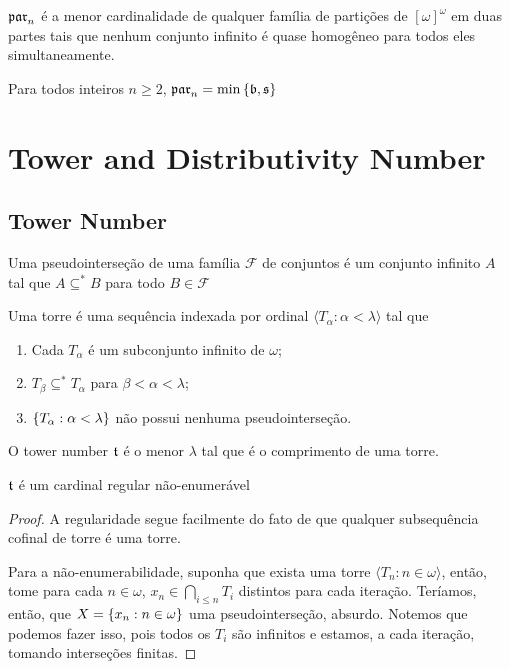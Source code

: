 \begin{definition}
    $\mathfrak{par}_n$ é a menor cardinalidade de qualquer família de partições de $[\omega]^\omega$ em duas partes tais que nenhum conjunto infinito é quase homogêneo para todos eles simultaneamente.
\end{definition}

\begin{theorem}
    Para todos inteiros $n \geq 2$, $\mathfrak{par}_n = \min\left\{ \mathfrak{b},\mathfrak{s} \right\}$
\end{theorem}

\section{Tower and Distributivity Number}
\subsection{Tower Number}
\begin{definition}
    Uma pseudointerseção de uma família $\mathcal F$ de conjuntos é um conjunto infinito $A$ tal que $A \subseteq^* B$ para todo $B \in \mathcal F$
\end{definition}

\begin{definition}
    Uma torre é uma sequência indexada por ordinal $\langle T_\alpha: \alpha < \lambda \rangle$ tal que
    \begin{enumerate}[label=\roman*)]
        \item Cada $T_\alpha$ é um subconjunto infinito de $\omega$;
        \item $T_\beta \subseteq^* T_\alpha$ para $\beta < \alpha < \lambda$;
        \item $\left\{ T_\alpha : \alpha < \lambda \right\}$ não possui nenhuma pseudointerseção.
    \end{enumerate}
\end{definition}

\begin{definition}
    O tower number $\mathfrak{t}$ é o menor $\lambda$ tal que é o comprimento de uma torre.
\end{definition}

\begin{proposition}
    $\mathfrak{t}$ é um cardinal regular não-enumerável
\end{proposition}
\begin{proof}
    A regularidade segue facilmente do fato de que qualquer subsequência cofinal de torre é uma torre. 
    
    Para a não-enumerabilidade, suponha que exista uma torre $\langle T_n : n\in \omega\rangle$, então, tome para cada $n\in\omega$, $x_n\in \bigcap_{i\leq n} T_i$ distintos para cada iteração. Teríamos, então, que $X = \left\{ x_n : n\in \omega \right\}$ uma pseudointerseção, absurdo. Notemos que podemos fazer isso, pois todos os $T_i$ são infinitos e estamos, a cada iteração, tomando interseções finitas.  
\end{proof}

